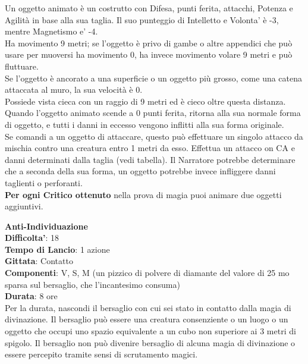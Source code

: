 \begin{multicols}{2}

Un oggetto animato è un costrutto con Difesa, punti ferita, attacchi, Potenza e Agilità in base alla sua taglia. Il suo punteggio di Intelletto e Volonta' è -3, mentre Magnetismo e' -4.\\
Ha movimento 9 metri; se l’oggetto è privo di gambe o altre appendici che può usare per muoversi ha movimento 0, ha invece movimento volare 9 metri e può fluttuare. 
\\Se l’oggetto è ancorato a una superficie o un oggetto più grosso, come una catena attaccata al muro, la sua velocità è 0.\\
Possiede vista cieca con un raggio di 9 metri ed è cieco oltre questa distanza.\\
Quando l’oggetto animato scende a 0 punti ferita, ritorna alla sua normale forma di oggetto, e tutti i danni in eccesso vengono inflitti alla sua forma originale.\\
Se comandi a un oggetto di attaccare, questo può effettuare un singolo attacco da mischia contro una creatura entro 1 metri da esso. Effettua un attacco on CA e danni determinati dalla taglia (vedi tabella). Il Narratore potrebbe determinare che a seconda della sua forma, un oggetto potrebbe invece infliggere danni taglienti o perforanti.\\
\textbf{Per ogni Critico ottenuto} nella prova di magia puoi animare due oggetti aggiuntivi.

\medskip\textbf{Anti-Individuazione}\\
\textbf{Difficolta'}: 18\\
\textbf{Tempo di Lancio}: 1 azione\\
\textbf{Gittata}: Contatto\\
\textbf{Componenti}: V, S, M (un pizzico di polvere di diamante del valore di 25 mo sparsa sul bersaglio, che l’incantesimo consuma)\\
\textbf{Durata}: 8 ore\\
Per la durata, nascondi il bersaglio con cui sei stato in contatto dalla magia di divinazione. Il bersaglio può essere una creatura consenziente o un luogo o un oggetto che occupi uno spazio equivalente a un cubo non superiore ai 3 metri di spigolo. Il bersaglio non può divenire bersaglio di alcuna magia di divinazione o essere percepito tramite sensi di scrutamento magici.


\end{multicols}
